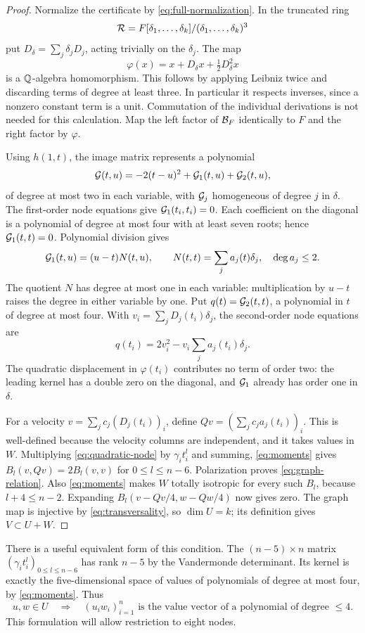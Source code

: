 \begin{proof}
Normalize the certificate by \eqref{eq:full-normalization}. In the
truncated ring
\[
 \mathcal R=F[\delta_1,\ldots,\delta_k]/(\delta_1,\ldots,\delta_k)^3
\]
put $D_\delta=\sum_j\delta_jD_j$, acting trivially on the $\delta_j$.
The map
\[
 \varphi(x)=x+D_\delta x+\tfrac12D_\delta^2x
\]
is a $\mathbb Q$-algebra homomorphism. This follows by applying Leibniz
twice and discarding terms of degree at least three. In particular
it respects inverses, since a nonzero constant term is a unit.
Commutation of the individual derivations is not needed for this
calculation. Map the left factor of $\mathcal B_F$ identically to $F$ and
the right factor by $\varphi$.

Using $h(1,t)$, the image matrix represents a polynomial
\[
 \mathcal G(t,u)=-2(t-u)^2+\mathcal G_1(t,u)+\mathcal G_2(t,u),
\]
of degree at most two in each variable, with $\mathcal G_j$ homogeneous
of degree $j$ in $\delta$. The first-order node equations give
$\mathcal G_1(t_i,t_i)=0$. Each coefficient on the diagonal is a polynomial
of degree at most four with at least seven roots; hence
$\mathcal G_1(t,t)=0$. Polynomial division gives
\[
 \mathcal G_1(t,u)=(u-t)N(t,u),\qquad
 N(t,t)=\sum_j a_j(t)\delta_j,\quad \deg a_j\le2.
\]
The quotient $N$ has degree at most one in each variable: multiplication
by $u-t$ raises the degree in either variable by one. Put
$q(t)=\mathcal G_2(t,t)$, a polynomial in $t$ of degree at most four.
With $v_i=\sum_jD_j(t_i)\delta_j$, the second-order node equations
are
\begin{equation}\label{eq:quadratic-node}
 q(t_i)=2v_i^2-v_i\sum_j a_j(t_i)\delta_j.
\end{equation}
The quadratic displacement in $\varphi(t_i)$ contributes no term of
order two: the leading kernel has a double zero on the diagonal,
and $\mathcal G_1$ already has order one in $\delta$.

For a velocity $v=\sum_j c_j(D_j(t_i))_i$, define
$Qv=(\sum_jc_j a_j(t_i))_i$. This is well-defined because the
velocity columns are independent, and it takes values in $W$.
Multiplying \eqref{eq:quadratic-node} by $\gamma_i t_i^l$ and
summing, \eqref{eq:moments} gives
$B_l(v,Qv)=2B_l(v,v)$ for $0\le l\le n-6$.
Polarization proves \eqref{eq:graph-relation}.
Also \eqref{eq:moments} makes $W$ totally isotropic for every
such $B_l$, because $l+4\le n-2$. Expanding
$B_l(v-Qv/4,w-Qw/4)$ now gives zero. The graph map is injective
by \eqref{eq:transversality}, so $\dim U=k$; its definition gives
$V\subset U+W$.
\end{proof}

There is a useful equivalent form of this condition. The
$(n-5)\times n$ matrix $(\gamma_i t_i^l)_{0\le l\le n-6}$ has
rank $n-5$ by the Vandermonde determinant. Its kernel is exactly
the five-dimensional space of values of polynomials of degree at
most four, by \eqref{eq:moments}. Thus
\begin{equation}\label{eq:product-property}
 u,w\in U\quad\Longrightarrow\quad
 (u_iw_i)_{i=1}^n\text{ is the value vector of a polynomial of degree }\le4.
\end{equation}
This formulation will allow restriction to eight nodes.
